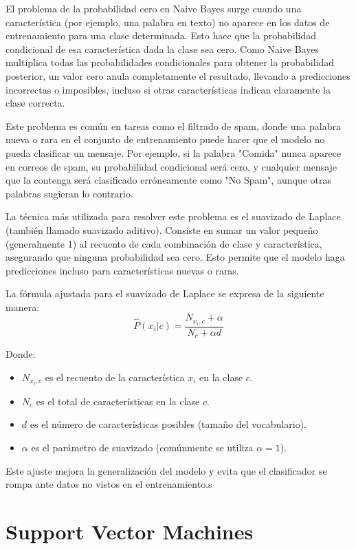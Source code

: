El problema de la probabilidad cero en Naive Bayes surge cuando una característica (por ejemplo, una palabra en texto) no aparece en los datos de entrenamiento para una clase determinada. Esto hace que la probabilidad condicional de esa característica dada la clase sea cero. Como Naive Bayes multiplica todas las probabilidades condicionales para obtener la probabilidad posterior, un valor cero anula completamente el resultado, llevando a predicciones incorrectas o imposibles, incluso si otras características indican claramente la clase correcta.

Este problema es común en tareas como el filtrado de spam, donde una palabra nueva o rara en el conjunto de entrenamiento puede hacer que el modelo no pueda clasificar un mensaje. Por ejemplo, si la palabra "Comida" nunca aparece en correos de spam, su probabilidad condicional será cero, y cualquier mensaje que la contenga será clasificado erróneamente como "No Spam", aunque otras palabras sugieran lo contrario. 

La técnica más utilizada para resolver este problema es el suavizado de Laplace (también llamado suavizado aditivo).  Consiste en sumar un valor pequeño (generalmente 1) al recuento de cada combinación de clase y característica, asegurando que ninguna probabilidad sea cero. Esto permite que el modelo haga predicciones incluso para características nuevas o raras.

La fórmula ajustada para el suavizado de Laplace se expresa de la siguiente manera:
\begin{equation}
\hat{P}(x_i | c) = \frac{N_{x_i,c} + \alpha}{N_c + \alpha d}
\end{equation}

Donde:
\begin{itemize}
    \item $N_{x_i,c}$ es el recuento de la característica $x_i$ en la clase $c$.
    \item $N_c$ es el total de características en la clase $c$.
    \item $d$ es el número de características posibles (tamaño del vocabulario).
    \item $\alpha$ es el parámetro de suavizado (comúnmente se utiliza $\alpha = 1$).
\end{itemize}

Este ajuste mejora la generalización del modelo y evita que el clasificador se rompa ante datos no vistos en el entrenamiento.s

\section{Support Vector Machines}

